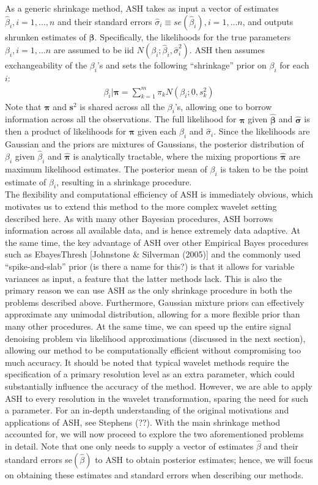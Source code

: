 \documentclass[12pt]{article}
\newcommand{\Gb}{\beta}
\newcommand{\s}{\sigma}
\begin{document}
As a generic shrinkage method, ASH takes as input a vector of estimates $\hat{\Gb}_i,i=1,...,n$ and their standard errors $\hat{\s}_i\equiv se(\hat{\Gb}_i),i=1,...n$, and outputs shrunken estimates of $\bm{\Gb}$. Specifically, the likelihoods for the true parameters $\Gb_i,i=1,...n$ are assumed to be iid $N(\Gb_i;\hat{\Gb}_i,\hat{\s}_i^2)$. ASH then assumes exchangeability of the $\Gb_i$'s and sets the following ``shrinkage'' prior on $\Gb_i$ for each $i$:
\begin{eqnarray}
\Gb_i|\bm{\pi}=\sum_{k=1}^m \pi_k N(\Gb_i;0,s_k^2)
\end{eqnarray}
Note that $\bm{\pi}$ and $\bm{s}^2$ is shared across all the $\Gb_i$'s, allowing one to borrow information across all the observations. The full likelihood for $\bm{\pi}$ given $\bm{\hat{\Gb}}$ and $\bm{\hat{\s}}$ is then a product of likelihoods for $\bm{\pi}$ given each $\hat{\Gb}_i$ and $\hat{\s}_i$. Since the likelihoods are Gaussian and the priors are mixtures of Gaussians, the posterior distribution of $\Gb_i$ given $\hat{\Gb}_i$ and $\bm{\hat{\pi}}$ is analytically tractable, where the mixing proportions $\bm{\hat{\pi}}$ are maximum likelihood estimates. The posterior mean of $\Gb_i$ is taken to be the point estimate of $\Gb_i$, resulting in a shrinkage procedure.\bigskip\\
The flexibility and computational efficiency of ASH is immediately obvious, which motivates us to extend this method to the more complex wavelet setting described here. As with many other Bayesian procedures, ASH borrows information across all available data, and is hence extremely data adaptive. At the same time, the key advantage of ASH over other Empirical Bayes procedures such as EbayesThresh [Johnstone \& Silverman (2005)] and the commonly used ``spike-and-slab'' prior (is there a name for this?) is that it allows for variable variances as input, a feature that the latter methods lack. This is also the primary reason we can use ASH as the only shrinkage procedure in both the problems described above. Furthermore, Gaussian mixture priors can effectively approximate any unimodal distribution, allowing for a more flexible prior than many other procedures. At the same time, we can speed up the entire signal denoising problem via likelihood approximations (discussed in the next section), allowing our method to be computationally efficient without compromising too much accuracy. It should be noted that typical wavelet methods require the specification of a primary resolution level as an extra parameter, which could substantially influence the accuracy of the method. However, we are able to apply ASH to every resolution in the wavelet transformation, sparing the need for such a parameter. For an in-depth understanding of the original motivations and applications of ASH, see Stephens (??). With the main shrinkage method accounted for, we will now proceed to explore the two aforementioned problems in detail. Note that one only needs to supply a vector of estimates $\hat{\Gb}$ and their standard errors se$(\hat{\Gb})$ to ASH to obtain posterior estimates; hence, we will focus on obtaining these estimates and standard errors when describing our methods.
\end{document}
